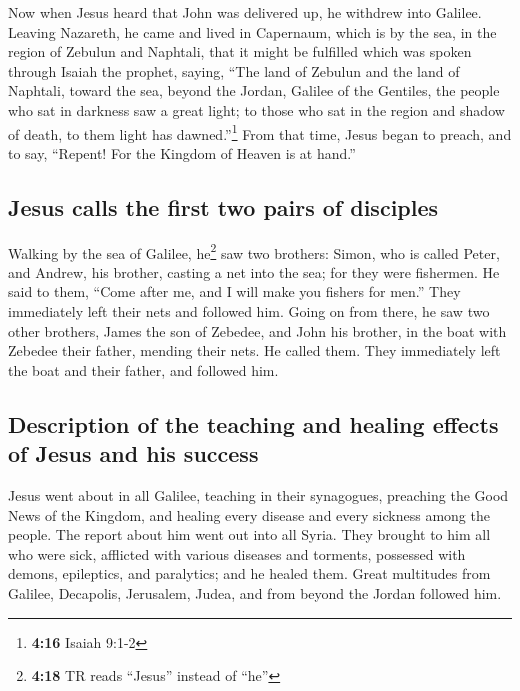 Now when Jesus heard that John was delivered up, he
withdrew into Galilee.  Leaving Nazareth, he came and
lived in Capernaum, which is by the sea, in the region of Zebulun and
Naphtali,  that it might be fulfilled which was spoken
through Isaiah the prophet, saying,  ``The land of
Zebulun and the land of Naphtali, toward the sea, beyond the Jordan,
Galilee of the Gentiles,  the people who sat in darkness
saw a great light; to those who sat in the region and shadow of death,
to them light has dawned.''\footnote{\textbf{4:16} Isaiah 9:1-2}
 From that time, Jesus began to preach, and to say,
``Repent! For the Kingdom of Heaven is at hand.''

\hypertarget{jesus-calls-the-first-two-pairs-of-disciples}{%
\subsection{Jesus calls the first two pairs of
disciples}\label{jesus-calls-the-first-two-pairs-of-disciples}}

 Walking by the sea of Galilee, he\footnote{\textbf{4:18}
  TR reads ``Jesus'' instead of ``he''} saw two brothers: Simon, who is
called Peter, and Andrew, his brother, casting a net into the sea; for
they were fishermen.  He said to them, ``Come after me,
and I will make you fishers for men.''  They immediately
left their nets and followed him.  Going on from there,
he saw two other brothers, James the son of Zebedee, and John his
brother, in the boat with Zebedee their father, mending their nets. He
called them.  They immediately left the boat and their
father, and followed him.

\hypertarget{description-of-the-teaching-and-healing-effects-of-jesus-and-his-success}{%
\subsection{Description of the teaching and healing effects of Jesus and
his
success}\label{description-of-the-teaching-and-healing-effects-of-jesus-and-his-success}}

 Jesus went about in all Galilee, teaching in their
synagogues, preaching the Good News of the Kingdom, and healing every
disease and every sickness among the people.  The report
about him went out into all Syria. They brought to him all who were
sick, afflicted with various diseases and torments, possessed with
demons, epileptics, and paralytics; and he healed them. 
Great multitudes from Galilee, Decapolis, Jerusalem, Judea, and from
beyond the Jordan followed him.

